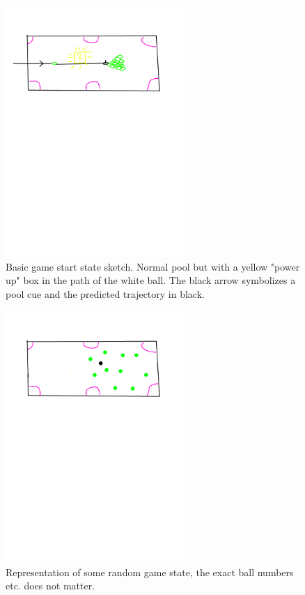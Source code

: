 \documentclass{article}
\begin{document}
\begin{figure}[!htb]
\centering
\includegraphics[trim={2cm 17cm 2cm 2cm},width=0.6\textwidth,clip]{img/game_state_0.png}
\caption{Basic game start state sketch. Normal pool but with a yellow "power up" box in the path of the white ball. The black arrow symbolizes a pool cue and the predicted trajectory in black.}
\label{fig:game_state_0}
\end{figure}

\begin{figure}[!htb]
	\centering
	\includegraphics[trim={2cm 17cm 2cm 2cm},width=0.6\textwidth,clip]{img/game_state_1.png}
	\caption{Representation of some random game state, the exact ball numbers etc. does not matter.}
	\label{fig:game_state_1}
\end{figure}
\end{document}
